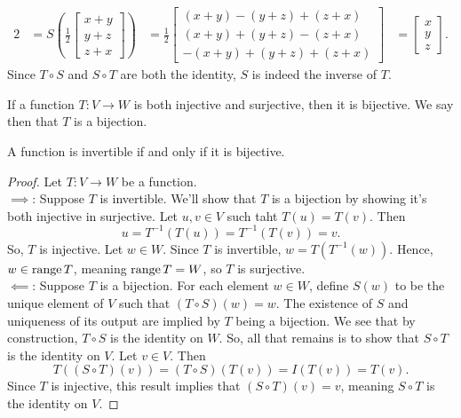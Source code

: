 \begin{answer}
\begin{alignat*}{2}
		&= S\left(\frac{1}{2}\begin{bmatrix} x+y \\ y+z \\ z+x \end{bmatrix}\right) 
		&= \frac{1}{2}\begin{bmatrix} (x+y)-(y+z)+(z+x) \\ (x+y)+(y+z)-(z+x) \\ -(x+y)+(y+z)+(z+x) \end{bmatrix} 
		&= \begin{bmatrix} x \\ y \\ z \end{bmatrix}.
	\end{alignat*}
	Since $T \circ S$ and $S \circ T$ are both the identity, $S$ is indeed the inverse of $T$.
\end{answer}

\begin{definition}
	If a function $T: V \to W$ is both injective and surjective, then it is bijective.
	We say then that $T$ is a bijection.
\end{definition}

\begin{theorem}
	A function is invertible if and only if it is bijective.
\end{theorem}
\begin{proof}
	Let $T: V \to W$ be a function. \\
	
	$\implies$: Suppose $T$ is invertible.
	We'll show that $T$ is a bijection by showing it's both injective in surjective.
	Let $u, v \in V$ such taht $T(u) = T(v)$.
	Then
	\begin{equation*}
		u = T^{-1}(T(u)) = T^{-1}(T(v)) = v.
	\end{equation*}
	So, $T$ is injective.
	Let $w \in W$.
	Since $T$ is invertible, $w = T(T^{-1}(w))$.
	Hence, $w \in \operatorname{range}{T}$, meaning $\operatorname{range}{T} = W$, so $T$ is surjective. \\
	
	$\impliedby$: Suppose $T$ is a bijection.
	For each element $w \in W$, define $S(w)$ to be the unique element of $V$ such that $(T \circ S)(w) = w$.
	The existence of $S$ and uniqueness of its output are implied by $T$ being a bijection.
	We see that by construction, $T \circ S$ is the identity on $W$.
	So, all that remains is to show that $S \circ T$ is the identity on $V$.
	Let $v \in V$.
	Then
	\begin{equation*}
		T((S \circ T)(v)) = (T \circ S)(T(v)) = I(T(v)) = T(v).
	\end{equation*}
	Since $T$ is injective, this result implies that $(S \circ T)(v) = v$, meaning $S \circ T$ is the identity on $V$.
\end{proof}

